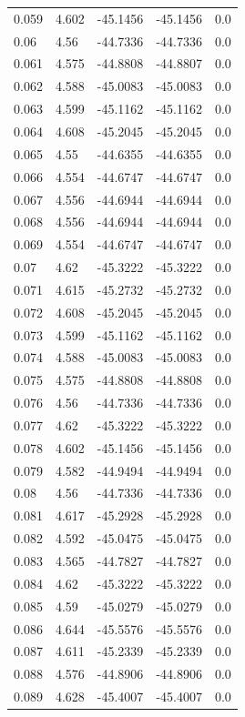 \begin{table}[H]
\begin{tabular}{lllll}
0.059 & 4.602 & -45.1456 & -45.1456 & 0.0 \\
0.06 & 4.56 & -44.7336 & -44.7336 & 0.0 \\
0.061 & 4.575 & -44.8808 & -44.8807 & 0.0 \\
0.062 & 4.588 & -45.0083 & -45.0083 & 0.0 \\
0.063 & 4.599 & -45.1162 & -45.1162 & 0.0 \\
0.064 & 4.608 & -45.2045 & -45.2045 & 0.0 \\
0.065 & 4.55 & -44.6355 & -44.6355 & 0.0 \\
0.066 & 4.554 & -44.6747 & -44.6747 & 0.0 \\
0.067 & 4.556 & -44.6944 & -44.6944 & 0.0 \\
0.068 & 4.556 & -44.6944 & -44.6944 & 0.0 \\
0.069 & 4.554 & -44.6747 & -44.6747 & 0.0 \\
0.07 & 4.62 & -45.3222 & -45.3222 & 0.0 \\
0.071 & 4.615 & -45.2732 & -45.2732 & 0.0 \\
0.072 & 4.608 & -45.2045 & -45.2045 & 0.0 \\
0.073 & 4.599 & -45.1162 & -45.1162 & 0.0 \\
0.074 & 4.588 & -45.0083 & -45.0083 & 0.0 \\
0.075 & 4.575 & -44.8808 & -44.8808 & 0.0 \\
0.076 & 4.56 & -44.7336 & -44.7336 & 0.0 \\
0.077 & 4.62 & -45.3222 & -45.3222 & 0.0 \\
0.078 & 4.602 & -45.1456 & -45.1456 & 0.0 \\
0.079 & 4.582 & -44.9494 & -44.9494 & 0.0 \\
0.08 & 4.56 & -44.7336 & -44.7336 & 0.0 \\
0.081 & 4.617 & -45.2928 & -45.2928 & 0.0 \\
0.082 & 4.592 & -45.0475 & -45.0475 & 0.0 \\
0.083 & 4.565 & -44.7827 & -44.7827 & 0.0 \\
0.084 & 4.62 & -45.3222 & -45.3222 & 0.0 \\
0.085 & 4.59 & -45.0279 & -45.0279 & 0.0 \\
0.086 & 4.644 & -45.5576 & -45.5576 & 0.0 \\
0.087 & 4.611 & -45.2339 & -45.2339 & 0.0 \\
0.088 & 4.576 & -44.8906 & -44.8906 & 0.0 \\
0.089 & 4.628 & -45.4007 & -45.4007 & 0.0 \\

\end{tabular}
\end{table}
